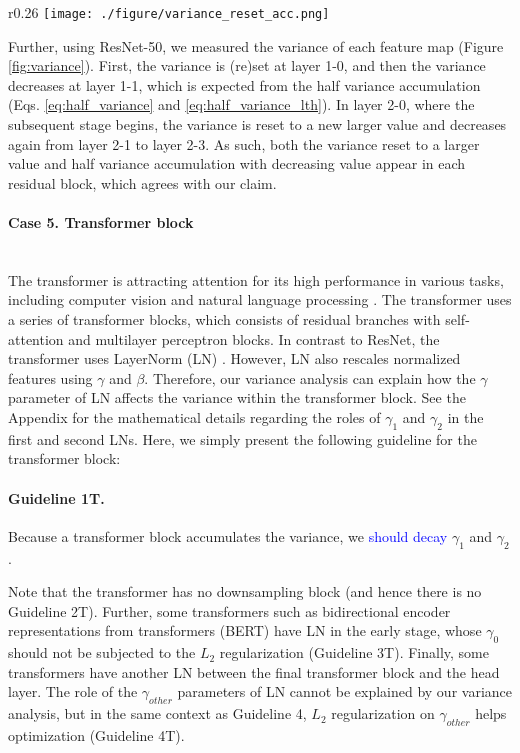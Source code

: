 \documentclass{article}
\begin{document}
\begin{wrapfigure}{r}{0.26\textwidth}
	\centering
\texttt{[image: ./figure/variance\_reset\_acc.png]}
    \caption{Variance of each feature map of ResNet-50 pre-trained on ImageNet.}
    \label{fig:variance}
\end{wrapfigure}

Further, using ResNet-50, we measured the variance of each feature map (Figure \ref{fig:variance}). First, the variance is (re)set at layer 1-0, and then the variance decreases at layer 1-1, which is expected from the half variance accumulation (Eqs. \ref{eq:half_variance} and \ref{eq:half_variance_lth}). In layer 2-0, where the subsequent stage begins, the variance is reset to a new larger value and decreases again from layer 2-1 to layer 2-3. As such, both the variance reset to a larger value and half variance accumulation with decreasing value appear in each residual block, which agrees with our claim.

\paragraph{Case 5. Transformer block} \ \\
The transformer is attracting attention for its high performance in various tasks, including computer vision \cite{giclr/DosovitskiyB0WZ21} and natural language processing \cite{gnips/VaswaniSPUJGKP17,gnaacl/DevlinCLT19}. The transformer uses a series of transformer blocks, which consists of residual branches with self-attention and multilayer perceptron blocks. In contrast to ResNet, the transformer uses LayerNorm (LN) \cite{gcorr/BaKH16}. However, LN also rescales normalized features using $\gamma$ and $\beta$. Therefore, our variance analysis can explain how the $\gamma$ parameter of LN affects the variance within the transformer block. See the Appendix for the mathematical details regarding the roles of $\gamma_1$ and $\gamma_2$ in the first and second LNs. Here, we simply present the following guideline for the transformer block:
\paragraph{Guideline 1T.}Because a transformer block accumulates the variance, we \textcolor{blue}{should decay} $\gamma_1$ and $\gamma_2$.

Note that the transformer has no downsampling block (and hence there is no Guideline 2T). Further, some transformers such as bidirectional encoder representations from transformers (BERT) \cite{gnaacl/DevlinCLT19} have LN in the early stage, whose $\gamma_0$ should not be subjected to the $L_2$ regularization (Guideline 3T). Finally, some transformers \cite{gnips/VaswaniSPUJGKP17} have another LN between the final transformer block and the head layer. The role of the $\gamma_{other}$ parameters of LN cannot be explained by our variance analysis, but in the same context as Guideline 4, $L_2$ regularization on $\gamma_{other}$ helps optimization (Guideline 4T).
\end{document}
